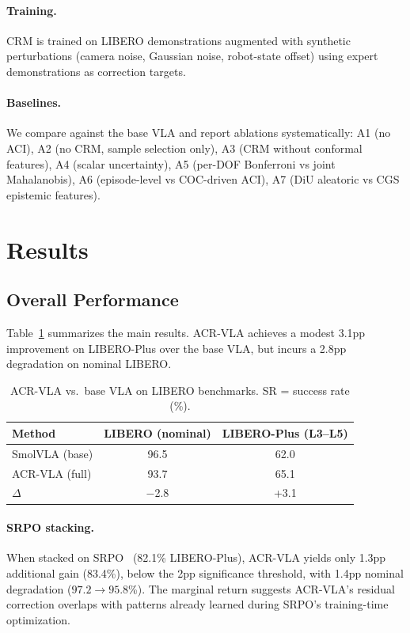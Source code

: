 \documentclass[letterpaper]{article}
\newcommand{\fail}[1]{\textcolor{failred}{#1}}
\begin{document}
\paragraph{Training.} CRM is trained on LIBERO demonstrations augmented with synthetic perturbations (camera noise, Gaussian noise, robot-state offset) using expert demonstrations as correction targets.

\paragraph{Baselines.} We compare against the base VLA and report ablations systematically: A1 (no ACI), A2 (no CRM, sample selection only), A3 (CRM without conformal features), A4 (scalar uncertainty), A5 (per-DOF Bonferroni vs joint Mahalanobis), A6 (episode-level vs COC-driven ACI), A7 (DiU aleatoric vs CGS epistemic features).

\section{Results}

\subsection{Overall Performance}

Table~\ref{tab:main} summarizes the main results.
ACR-VLA achieves a modest 3.1pp improvement on LIBERO-Plus over the base VLA, but incurs a 2.8pp degradation on nominal LIBERO.

\begin{table}[h]
\centering
\caption{ACR-VLA vs.\ base VLA on LIBERO benchmarks. SR = success rate (\%).}
\label{tab:main}
\begin{tabular}{lcc}
\toprule
\textbf{Method} & \textbf{LIBERO (nominal)} & \textbf{LIBERO-Plus (L3--L5)} \\
\midrule
SmolVLA (base) & 96.5 & 62.0 \\
ACR-VLA (full) & 93.7 & 65.1 \\
$\Delta$ & \fail{$-$2.8} & +3.1 \\
\bottomrule
\end{tabular}
\end{table}

\paragraph{SRPO stacking.}
When stacked on SRPO~\citep{srpo2025} (82.1\% LIBERO-Plus), ACR-VLA yields only 1.3pp additional gain (83.4\%), below the 2pp significance threshold, with 1.4pp nominal degradation ($97.2 \to 95.8$\%).
The marginal return suggests ACR-VLA's residual correction overlaps with patterns already learned during SRPO's training-time optimization.
\end{document}
